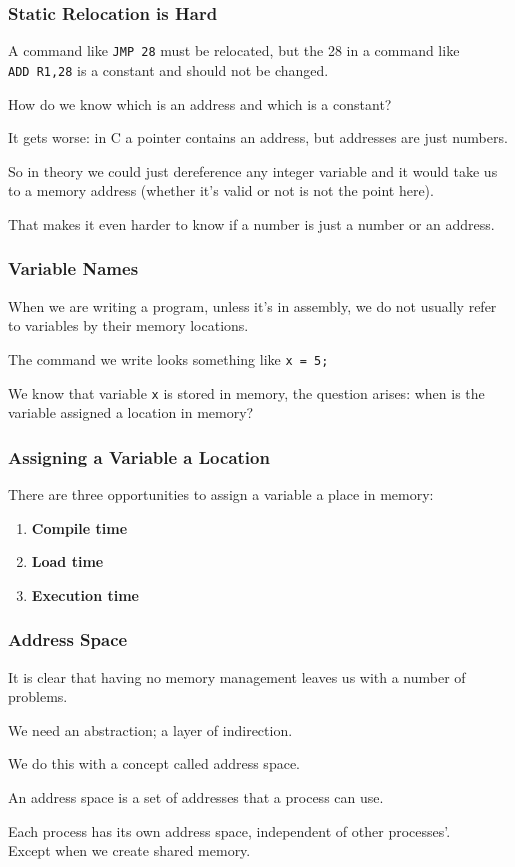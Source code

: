 \begin{frame}
\frametitle{Static Relocation is Hard}

A command like \texttt{JMP 28} must be relocated, but the 28 in a command like \texttt{ADD~R1,28} is a constant and should not be changed. 

How do we know which is an address and which is a constant? 

It gets worse: in C a pointer contains an address, but addresses are just numbers. 

So in theory we could just dereference any integer variable and it would take us to a memory address (whether it's valid or not is not the point here). 

That makes it even harder to know if a number is just a number or an address.


\end{frame}

\begin{frame}
\frametitle{Variable Names}

When we are writing a program, unless it's in assembly, we do not usually refer to variables by their memory locations.

The command we write looks something like \texttt{x = 5;} 

We know that variable \texttt{x} is stored in memory, the question arises: when is the variable assigned a location in memory?


\end{frame}

\begin{frame}
\frametitle{Assigning a Variable a Location}

There are three opportunities to assign a variable a place in memory:

\begin{enumerate}
	\item \textbf{Compile time}
	\item \textbf{Load time}
	\item \textbf{Execution time}
\end{enumerate}


\end{frame}

\begin{frame}
\frametitle{Address Space}

It is clear that having no memory management leaves us with a number of problems. 

We need an abstraction; a layer of indirection. 

We do this with a concept called \alert{address space}. 

An address space is a set of addresses that a process can use.

Each process has its own address space, independent of other processes'.\\
\quad Except when we create shared memory.

\end{frame}

